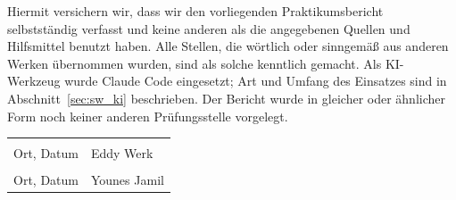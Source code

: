 
Hiermit versichern wir, dass wir den vorliegenden Praktikumsbericht selbstständig verfasst und
keine anderen als die angegebenen Quellen und Hilfsmittel benutzt haben. Alle Stellen, die
wörtlich oder sinngemäß aus anderen Werken übernommen wurden, sind als solche kenntlich gemacht.
Als \ac{KI}-Werkzeug wurde Claude Code eingesetzt; Art und Umfang des Einsatzes sind in
Abschnitt~\ref{sec:sw_ki} beschrieben. Der Bericht wurde in gleicher oder ähnlicher Form noch
keiner anderen Prüfungsstelle vorgelegt.
\vspace{3cm}

\noindent
\begin{tabular}{@{}p{6cm} p{6cm}@{}}
  \hrulefill & \hrulefill \\
  Ort, Datum & Eddy Werk \\[2.5cm]
  \hrulefill & \hrulefill \\
  Ort, Datum & Younes Jamil \\
\end{tabular}
